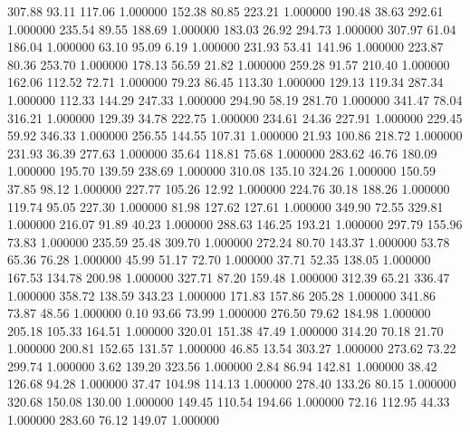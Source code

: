     307.88     93.11    117.06  1.000000
    152.38     80.85    223.21  1.000000
    190.48     38.63    292.61  1.000000
    235.54     89.55    188.69  1.000000
    183.03     26.92    294.73  1.000000
    307.97     61.04    186.04  1.000000
     63.10     95.09      6.19  1.000000
    231.93     53.41    141.96  1.000000
    223.87     80.36    253.70  1.000000
    178.13     56.59     21.82  1.000000
    259.28     91.57    210.40  1.000000
    162.06    112.52     72.71  1.000000
     79.23     86.45    113.30  1.000000
    129.13    119.34    287.34  1.000000
    112.33    144.29    247.33  1.000000
    294.90     58.19    281.70  1.000000
    341.47     78.04    316.21  1.000000
    129.39     34.78    222.75  1.000000
    234.61     24.36    227.91  1.000000
    229.45     59.92    346.33  1.000000
    256.55    144.55    107.31  1.000000
     21.93    100.86    218.72  1.000000
    231.93     36.39    277.63  1.000000
     35.64    118.81     75.68  1.000000
    283.62     46.76    180.09  1.000000
    195.70    139.59    238.69  1.000000
    310.08    135.10    324.26  1.000000
    150.59     37.85     98.12  1.000000
    227.77    105.26     12.92  1.000000
    224.76     30.18    188.26  1.000000
    119.74     95.05    227.30  1.000000
     81.98    127.62    127.61  1.000000
    349.90     72.55    329.81  1.000000
    216.07     91.89     40.23  1.000000
    288.63    146.25    193.21  1.000000
    297.79    155.96     73.83  1.000000
    235.59     25.48    309.70  1.000000
    272.24     80.70    143.37  1.000000
     53.78     65.36     76.28  1.000000
     45.99     51.17     72.70  1.000000
     37.71     52.35    138.05  1.000000
    167.53    134.78    200.98  1.000000
    327.71     87.20    159.48  1.000000
    312.39     65.21    336.47  1.000000
    358.72    138.59    343.23  1.000000
    171.83    157.86    205.28  1.000000
    341.86     73.87     48.56  1.000000
      0.10     93.66     73.99  1.000000
    276.50     79.62    184.98  1.000000
    205.18    105.33    164.51  1.000000
    320.01    151.38     47.49  1.000000
    314.20     70.18     21.70  1.000000
    200.81    152.65    131.57  1.000000
     46.85     13.54    303.27  1.000000
    273.62     73.22    299.74  1.000000
      3.62    139.20    323.56  1.000000
      2.84     86.94    142.81  1.000000
     38.42    126.68     94.28  1.000000
     37.47    104.98    114.13  1.000000
    278.40    133.26     80.15  1.000000
    320.68    150.08    130.00  1.000000
    149.45    110.54    194.66  1.000000
     72.16    112.95     44.33  1.000000
    283.60     76.12    149.07  1.000000
